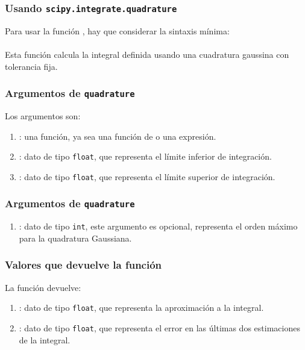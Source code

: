 \documentclass[12pt]{beamer}
\begin{document}
\begin{frame}[fragile]
\frametitle{Usando \texttt{scipy.integrate.quadrature}}
Para usar la función , hay que considerar la sintaxis mínima:
\pause
\\
\bigskip
{}
\\
\bigskip
\pause
Esta función calcula la integral definida usando una cuadratura gaussina con tolerancia fija.
\end{frame}
\begin{frame}
\frametitle{Argumentos de \texttt{quadrature}}
Los argumentos son:
\begin{enumerate}[<+->]
\item {} : una función, ya sea una función de \python{} o una expresión.
\item {} : dato de tipo \texttt{float}, que representa el límite inferior de integración.
\item {} : dato de tipo \texttt{float}, que representa el límite superior de integración.
\seti
\end{enumerate}
\end{frame}
\begin{frame}
\frametitle{Argumentos de \texttt{quadrature}}
\begin{enumerate}
\conti    
\item {} : dato de tipo \texttt{int}, este argumento es opcional, representa el orden máximo para la quadratura Gaussiana.
\end{enumerate}
\end{frame}
\begin{frame}
\frametitle{Valores que devuelve la función}
La función devuelve:
\pause
{}
\begin{enumerate}[<+->]
\item {} : dato de tipo \texttt{float}, que representa la aproximación a la integral.
\item {} : dato de tipo \texttt{float}, que representa el error en las últimas dos estimaciones de la integral.
\end{enumerate}
\end{frame}
\end{document}
